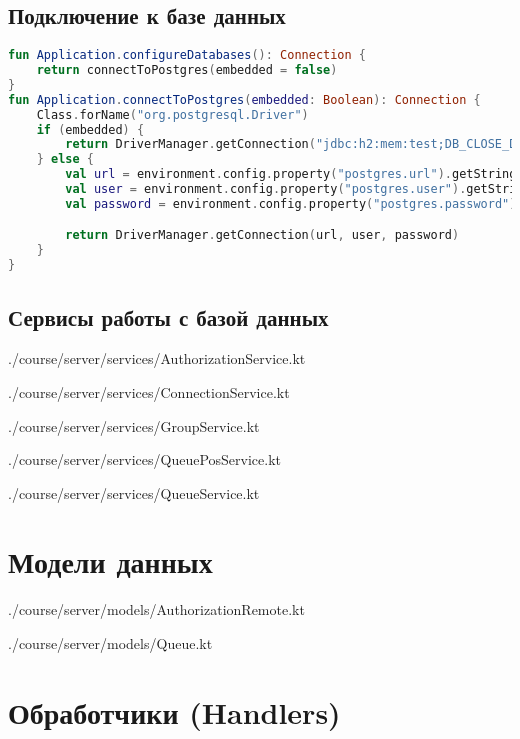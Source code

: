 \subsection{Подключение к базе данных}\label{lst:db:connect}
\begin{lstlisting}[language=Kotlin
	, caption=\leftline{Подключение к базе данных}]
fun Application.configureDatabases(): Connection {
    return connectToPostgres(embedded = false)
}
fun Application.connectToPostgres(embedded: Boolean): Connection {
    Class.forName("org.postgresql.Driver")
    if (embedded) {
        return DriverManager.getConnection("jdbc:h2:mem:test;DB_CLOSE_DELAY=-1", "root", "")
    } else {
        val url = environment.config.property("postgres.url").getString()
        val user = environment.config.property("postgres.user").getString()
        val password = environment.config.property("postgres.password").getString()

        return DriverManager.getConnection(url, user, password)
    }
}
\end{lstlisting}

\subsection{Сервисы работы с базой данных}\label{lst:db:service}

{./course/server/services/AuthorizationService.kt}

{./course/server/services/ConnectionService.kt}

{./course/server/services/GroupService.kt}

{./course/server/services/QueuePosService.kt}

{./course/server/services/QueueService.kt}

\section{Модели данных}

{./course/server/models/AuthorizationRemote.kt}

{./course/server/models/Queue.kt}

\section{Обработчики (Handlers)}

